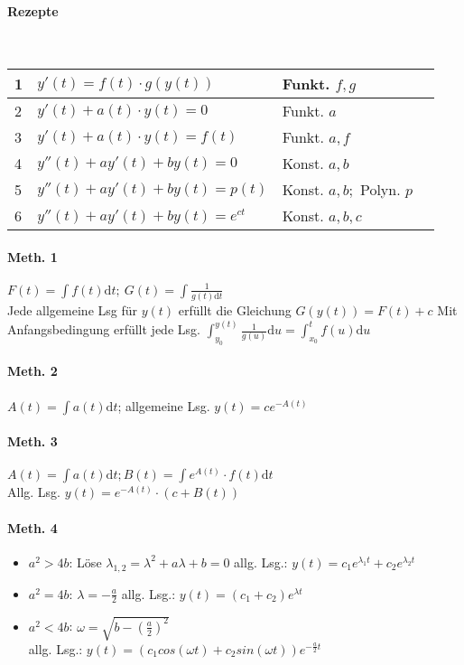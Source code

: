\documentclass[paper=a3,paper=landscape, fontsize=9pt,DIV=30]{scrartcl}
\begin{document}
\begin{multicols*}{4}
  \paragraph{Rezepte}\hspace{0pt}\\

  \begin{tabular}{|l|l|l|l|}
    \hline
    1   & $y'(t)=f(t) \cdot g(y(t))$      & Funkt. $f,g$              \\ \hline
    2   & $y'(t)+a(t) \cdot y(t) = 0$     & Funkt. $a$                \\ \hline
    3   & $y'(t)+a(t) \cdot y(t) = f(t)$  & Funkt. $a,f$              \\ \hline
    4   & $y''(t)+ay'(t)+by(t) = 0$       & Konst. $a,b$              \\ \hline
    5   & $y''(t)+ay'(t)+by(t) = p(t)$    & Konst. $a,b;$ Polyn. $p$  \\ \hline
    6   & $y''(t)+ay'(t)+by(t) = e^{ct}$   & Konst. $a,b,c$            \\ \hline
  \end{tabular}

  \paragraph{Meth. 1}
  $F(t)=\int f(t) \mathrm{d}t;\ G(t)=\int \frac{1}{g(t)\mathrm{d}t}$\\
  Jede allgemeine Lsg für $y(t)$ erfüllt die Gleichung $G(y(t))=F(t)+c$
  Mit Anfangsbedingung erfüllt jede Lsg. $\int_{y_0}^{y(t)}\frac{1}{g(u)}\mathrm{d}u=\int_{x_0}^{t}f(u)\mathrm{d}u$

  \paragraph{Meth. 2}
  $A(t)=\int a(t)\mathrm{d}t$; allgemeine Lsg. $y(t)=ce^{-A(t)}$

  \paragraph{Meth. 3}
  $A(t)=\int a(t)\mathrm{d}t; B(t)=\int e^{A(t)} \cdot f(t) \mathrm{d}t$\\
  Allg. Lsg. $y(t)=e^{-A(t)} \cdot (c+B(t))$

  \paragraph{Meth. 4}
  \begin{itemize}
  	\item $a^2>4b$: Löse $\lambda_{1,2}=\lambda^2+a\lambda + b = 0$
  	allg. Lsg.: $y(t)=c_1e^{\lambda_1t}+c_2e^{\lambda_2t}$
  	\item $a^2=4b$: $\lambda = - \frac{a}{2}$
  	allg. Lsg.: $y(t)=(c_1+c_2)e^{\lambda t}$
  	\item $a^2<4b$: $\omega = \sqrt{b - (\frac{a}{2})^2}$\\
  	allg. Lsg.: $y(t)=(c_1cos(\omega t) + c_2sin(\omega t))e^{-\frac{a}{2}t}$
  \end{itemize}


\end{multicols*}
\end{document}
